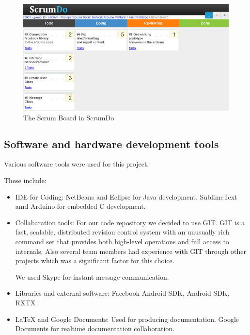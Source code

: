\begin{figure}[h!]
\centering \includegraphics{img/mgmt-scrumdo} \caption{The Scrum Board in ScrumDo}
\label{fig:mgmt-scrumdo}
\end{figure}

\newpage
\subsection{Software and hardware development tools}
Various software tools were used for this project.

These include:\newline
\begin{itemize}
	\item{IDE for Coding:} \newline
	NetBeans and Eclipse for Java development. SublimeText amd Arduino for embedded C development.

	\item{Collabaration tools:} \newline
	For our code repository we decided to use GIT\cite{link:git}. GIT is a fast, scalable, distributed revision control system 
	with an unusually rich command set that provides both high-level operations and full access to internals. Also 
	several team members had experience with GIT through other projects which was a significant factor for 
	this choice.

	We used Skype for instant message communication.

	\item{Libraries and external software:} \newline
	 Facebook Android SDK, Android SDK, RXTX

	\item{\LaTeX{} and Google Documents:} \newline
	Used for producing documentation. Google Documents for realtime documentation collaboration.

\end{itemize}

